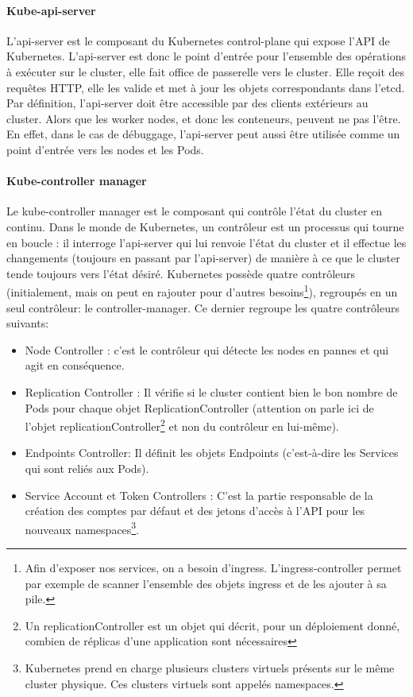 \documentclass[11pt,fleqn]{book} %
\begin{document}
\paragraph*{Kube-api-server}
L'api-server est le composant du Kubernetes control-plane qui expose l'API de Kubernetes. L'api-server est donc le point d'entrée pour l'ensemble des opérations à exécuter sur le cluster, elle fait office de passerelle vers le cluster. Elle reçoit des requêtes HTTP, elle les valide et met à jour les objets correspondants dans l'etcd. Par définition, l'api-server doit être accessible par des clients extérieurs au cluster. Alors que les worker nodes, et donc les conteneurs, peuvent ne pas l'être. En effet, dans le cas de débuggage, l'api-server peut aussi être utilisée comme un point d'entrée vers les nodes et les Pods.


\paragraph*{Kube-controller manager}
Le kube-controller manager est le composant qui contrôle l'état du cluster en continu. Dans le monde de Kubernetes, un contrôleur est un processus qui tourne en boucle : il interroge l'api-server qui lui renvoie l'état du cluster et il effectue les changements (toujours en passant par l'api-server) de manière à ce que le cluster tende toujours vers l'état désiré. Kubernetes possède quatre contrôleurs (initialement, mais on peut en rajouter pour d'autres besoins\footnote{Afin d'exposer nos services, on a besoin d'ingress. L'ingress-controller permet par exemple de scanner l'ensemble des objets ingress et de les ajouter à sa pile.}), regroupés en un seul contrôleur: le controller-manager. Ce dernier regroupe les quatre contrôleurs suivants: 
\begin{itemize}
    \item Node Controller : c'est le contrôleur qui détecte les nodes en pannes et qui agit en conséquence.
    \item Replication Controller : Il vérifie si le cluster contient bien le bon nombre de Pods pour chaque objet ReplicationController (attention on parle ici de l'objet replicationController\footnote{Un replicationController est un objet qui décrit, pour un déploiement donné, combien de réplicas d'une application sont nécessaires} et non du contrôleur en lui-même).
    \item Endpoints Controller: Il définit les objets Endpoints (c’est-à-dire les Services qui sont reliés aux Pods).
    \item Service Account et Token Controllers : C'est la partie responsable de la création des comptes par défaut et des jetons d'accès à l'API pour les nouveaux namespaces\footnote{Kubernetes prend en charge plusieurs clusters virtuels présents sur le même cluster physique. Ces clusters virtuels sont appelés namespaces.}.
\end{itemize}
\end{document}
